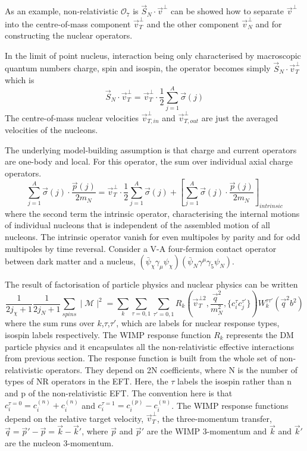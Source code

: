 \documentclass[12pt]{article}
\begin{document}
As an example, non-relativistic $\mathcal O_7$ is $\vec S_N \cdot \vec v^\bot $ can be showed how to  separate $\vec v^\bot $ into the centre-of-mass component $\vec v^\bot_T $ and the other component $\vec v^\bot_N $ and for constructing the nuclear operators. 

In the limit of point nucleus, interaction being only characterised by macroscopic quantum numbers charge, spin and isospin, the operator becomes simply $\vec S_N \cdot \vec v^\bot_T $ which is 
$$
\vec S_N \cdot \vec v^\bot_T  =  \vec v^\bot_T \cdot \frac{1}{2} \sum_{j=1}^A \vec \sigma(j) 
$$
The centre-of-mass nuclear velocities $\vec v^\bot_{T,in} $ and $\vec v^\bot_{T,out} $ are just the averaged velocities of the nucleons. 

The underlying model-building assumption is that charge and current operators are one-body and local. For this operator, the sum over individual axial charge operators. 
$$
\sum_{j=1}^A \vec \sigma(j) \cdot \frac{\vec p(j) }{2m_N} =  \vec v^\bot_T \cdot \frac{1}{2} \sum_{j=1}^A \vec \sigma(j)  + [   \sum_{j=1}^A \vec \sigma(j) \cdot \frac{\vec p(j) }{2m_N} ]_{intrinsic}
$$
where the second term the intrinsic operator, characterising the internal motions of individual nucleons that is independent of the assembled motion of all nucleons. The intrinsic operator vanish for even multipoles by parity and for odd multipoles by time reversal. Consider a V-A four-fermion contact operator between dark matter and a nucleus, $(\bar \psi_\chi \gamma_\mu \psi_\chi ) (\bar \psi_N \gamma^\mu \gamma_5 \psi_N)$. 


The result of factorisation of particle physics and nuclear physics can be written
$$
\frac{1}{2j_\chi +1} \frac{1}{2j_N +1} \sum_{spins} \mid \mathcal M \mid ^2  = \sum_k \sum_{\tau=0,1}
 \sum_{\tau'=0,1} R_k ( \vec v_T^{\bot2} , \frac{\vec q^2 }{m_N^2}, \{ c_i^\tau c_j^{\tau'} \}) W_k^{\tau \tau' } (\vec q^2 b^2) 
 $$
where the sum runs over $k$,$\tau$,$\tau'$, which are labels for nuclear response types, isospin labels respectively.
The WIMP response function $R_k$ represents the DM particle physics and it encapsulates all the non-relativistic effective interactions from previous section. The response function is built from the whole set of non-relativistic operators. They depend on 2N coefficients, where N is the number of types of NR operators in the EFT. Here, the $\tau$ labels the isospin rather than n and p of the non-relativistic EFT. The convention here is that $c^{\tau=0}_i = c_i^{(n)}+ c_i^{(n)}$ and $c^{\tau = 1}_i =c_i^{(p)}-c_i^{(n)}  $. The WIMP response functions depend on the relative target velocity, $\vec v_T^\bot$, the three-momentum transfer, $\vec q = \vec p' - \vec p = \vec k - \vec k'$, where $\vec p$ and $\vec p'$ are the WIMP 3-momentum and $\vec k$ and $\vec k'$ are the nucleon 3-momentum. 
\end{document}
